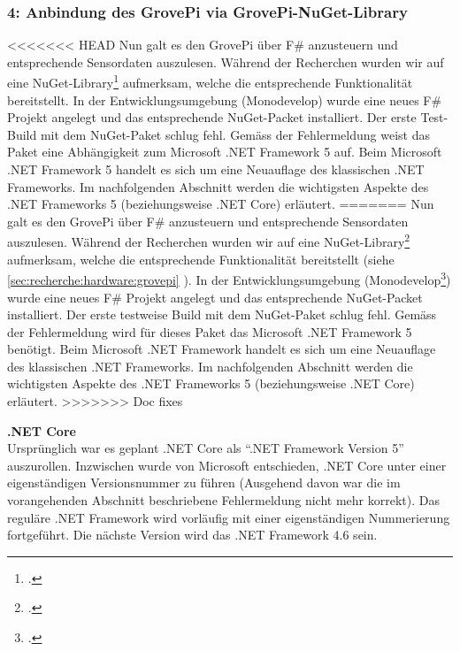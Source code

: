 \subsubsection{4: Anbindung des GrovePi via GrovePi-NuGet-Library}
<<<<<<< HEAD
Nun galt es den GrovePi über F\# anzusteuern und entsprechende Sensordaten auszulesen. Während der Recherchen wurden wir auf eine NuGet-Library\footcite{NuGet_GrovePi_2016-04-24} aufmerksam, welche die entsprechende Funktionalität bereitstellt. In der Entwicklungsumgebung (Monodevelop) wurde eine neues F\# Projekt angelegt und das entsprechende NuGet-Packet installiert. Der erste Test-Build mit dem NuGet-Paket schlug fehl. Gemäss der Fehlermeldung weist das Paket eine Abhängigkeit zum Microsoft .NET Framework 5 auf. Beim Microsoft .NET Framework 5 handelt es sich um eine Neuauflage des klassischen .NET Frameworks. Im nachfolgenden Abschnitt werden die wichtigsten Aspekte des .NET Frameworks 5 (beziehungsweise .NET Core) erläutert.
=======
Nun galt es den GrovePi über F\# anzusteuern und entsprechende Sensordaten auszulesen. Während der Recherchen wurden wir auf eine NuGet-Library\footcite{NuGet_GrovePi_2016-04-24} aufmerksam, welche die entsprechende Funktionalität bereitstellt (siehe \cref{sec:recherche:hardware:grovepi} ). In der Entwicklungsumgebung (Monodevelop\footcite{MonoDevelop_2016-06-19}) wurde eine neues F\# Projekt angelegt und das entsprechende NuGet-Packet installiert. Der erste testweise Build mit dem NuGet-Paket schlug fehl. Gemäss der Fehlermeldung wird für dieses Paket das Microsoft .NET Framework 5 benötigt. Beim Microsoft .NET Framework handelt es sich um eine Neuauflage des klassischen .NET Frameworks. Im nachfolgenden Abschnitt werden die wichtigsten Aspekte des .NET Frameworks 5 (beziehungsweise .NET Core) erläutert.
>>>>>>> Doc fixes

\textbf{.NET Core}\\
Ursprünglich war es geplant .NET Core als "`.NET Framework Version 5"' auszurollen. Inzwischen wurde von Microsoft entschieden, .NET Core unter einer eigenständigen Versionsnummer zu führen (Ausgehend davon war die im vorangehenden Abschnitt beschriebene Fehlermeldung nicht mehr korrekt). Das reguläre .NET Framework wird vorläufig mit einer eigenständigen Nummerierung fortgeführt. Die nächste Version wird das .NET Framework 4.6 sein.

